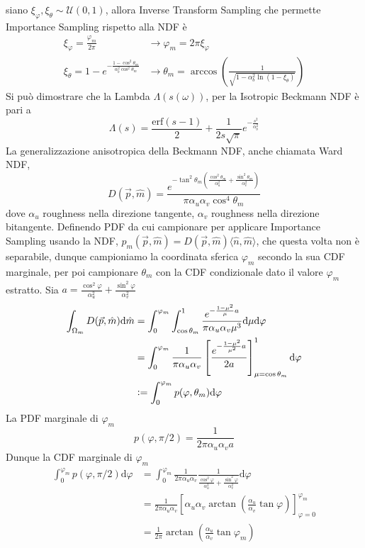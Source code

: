 siano $\xi_\varphi,\xi_\theta\sim\mathcal{U}(0,1)$, allora Inverse Transform Sampling che permette Importance Sampling rispetto alla NDF \`e 
\begin{align}
	\xi_\varphi=\frac{\varphi_m}{2\pi}&\longrightarrow\varphi_m=2\pi\xi_\varphi \\
	\xi_\theta=1-e^{-\frac{1-\cos^2\theta_m}{\alpha_b^2\cos^2\theta_m}}&\longrightarrow\theta_m=%
		\arccos\left(\frac{1}{\sqrt{1-\alpha_b^2\ln(1-\xi_\theta)}}\right)
\end{align}
Si pu\`o dimostrare che la Lambda $\Lambda(s(\omega))$, per la Isotropic Beckmann NDF \`e pari a 
\begin{equation}
	\Lambda(s)=\frac{\mathrm{erf}(s-1)}{2}+\frac{1}{2s\sqrt{\pi}}e^{-\frac{s^2}{\alpha_b^2}}
\end{equation}
La generalizzazione anisotropica della Beckmann NDF, anche chiamata Ward NDF,
\begin{equation}
	D(\vec{p},\hat{m})=\frac{e^{-\tan^2\theta_m\left(\frac{\cos^2\theta_m}{\alpha_u^2}+\frac{\sin^2\theta_m}{\alpha_v^2}\right)}}
		{\pi\alpha_u\alpha_v\cos^4\theta_m}
\end{equation}
dove $\alpha_u$ roughness nella direzione tangente, $\alpha_v$ roughness nella direzione bitangente. Definendo PDF da cui campionare per applicare
Importance Sampling usando la NDF, $p_m(\vec{p},\hat{m})=D(\vec{p},\hat{m})\langle\hat{n},\hat{m}\rangle$, che questa volta non \`e separabile, 
dunque campioniamo la coordinata sferica $\varphi_m$ secondo la sua CDF marginale, per poi campionare $\theta_m$ con la CDF condizionale dato il
valore $\varphi_m$ estratto. Sia \mbox{$a=\frac{\cos^2\varphi}{\alpha_u^2}+\frac{\sin^2\varphi}{\alpha_v^2}$}
\begin{align}
	\int_{\Omega_m}D(\vec{p},\hat{m})\mathrm{d}\hat{m}&=\int_0^{\varphi_m}\int_{\cos\theta_m}^1%
		\frac{e^{-\frac{1-\mu^2}{\mu}a}}{\pi\alpha_u\alpha_v\mu^3}\mathrm{d}\mu\mathrm{d}\varphi \nonumber \\
	&=\int_0^{\varphi_m}\frac{1}{\pi\alpha_u\alpha_v}\left[\frac{e^{-\frac{1-\mu^2}{\mu^2}a}}{2a}\right]_{\mu=\cos\theta_m}^1\mathrm{d}\varphi 
		\nonumber \\
	&\vcentcolon=\int_0^{\varphi_m}p(\varphi,\theta_m)\mathrm{d}\varphi
\end{align}
La PDF marginale di $\varphi_m$
\begin{equation}
	p(\varphi,\pi/2)=\frac{1}{2\pi\alpha_u\alpha_va}
\end{equation}
Dunque la CDF marginale di $\varphi_m$
\begin{align}
	\int_0^{\varphi_m}p(\varphi,\pi/2)\mathrm{d}\varphi&=\int_0^{\varphi_m}\frac{1}{2\pi\alpha_u\alpha_v}%
		\frac{1}{\frac{\cos^2\varphi}{\alpha_u^2}+\frac{\sin^2\varphi}{\alpha_v^2}}\mathrm{d}\varphi \nonumber \\
	&=\frac{1}{2\pi\alpha_u\alpha_v}\left[\alpha_u\alpha_v\arctan\left(\frac{\alpha_u}{\alpha_v}
		\tan\varphi\right)\right]_{\varphi=0}^{\varphi_m}\nonumber\\
	&=\frac{1}{2\pi}\arctan\left(\frac{\alpha_u}{\alpha_v}\tan\varphi_m\right)
\end{align}

